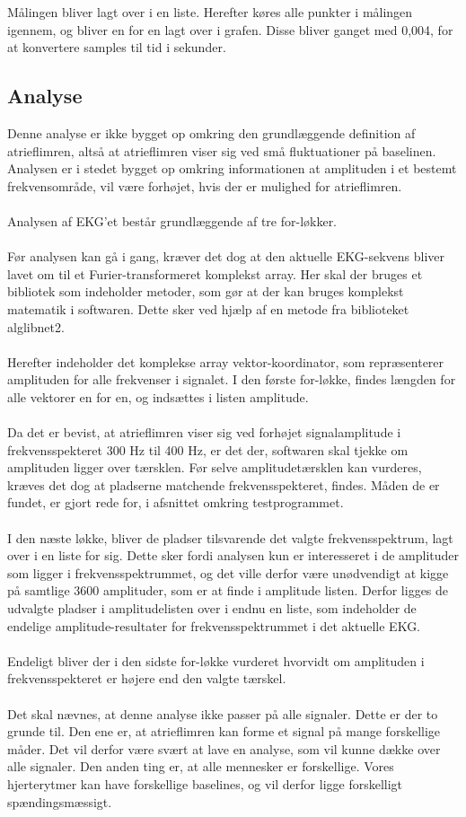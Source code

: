 Målingen bliver lagt over i en liste. Herefter køres alle punkter i målingen igennem, og bliver en for en lagt over i grafen. Disse bliver ganget med 0,004, for at konvertere samples til tid i sekunder. 


\subsection{Analyse}
Denne analyse er ikke bygget op omkring den grundlæggende definition af atrieflimren, altså at atrieflimren viser sig ved små fluktuationer på baselinen. Analysen er i stedet bygget op omkring informationen at amplituden i et bestemt frekvensområde, vil være forhøjet, hvis der er mulighed for atrieflimren. \\ \\
Analysen af EKG’et består grundlæggende af tre for-løkker. \\ \\
Før analysen kan gå i gang, kræver det dog at den aktuelle EKG-sekvens bliver lavet om til et Furier-transformeret komplekst array. Her skal der bruges et bibliotek som indeholder metoder, som gør at der kan bruges komplekst matematik i softwaren. Dette sker ved hjælp af en metode fra biblioteket alglibnet2. \\ \\
Herefter indeholder det komplekse array vektor-koordinator, som repræsenterer amplituden for alle frekvenser i signalet. I den første for-løkke, findes længden for alle vektorer en for en, og indsættes i listen amplitude. \\ \\
Da det er bevist, at atrieflimren viser sig ved forhøjet signalamplitude i frekvensspekteret 300 Hz til 400 Hz, er det der, softwaren skal tjekke om amplituden ligger over tærsklen. Før selve amplitudetærsklen kan vurderes, kræves det dog at pladserne matchende frekvensspekteret, findes. Måden de er fundet, er gjort rede for, i afsnittet omkring testprogrammet. \\ \\
I den næste løkke, bliver de pladser tilsvarende det valgte frekvensspektrum, lagt over i en liste for sig. Dette sker fordi analysen kun er interesseret i de amplituder som ligger i frekvensspektrummet, og det ville derfor være unødvendigt at kigge på samtlige 3600 amplituder, som er at finde i amplitude listen. Derfor ligges de udvalgte pladser i amplitudelisten over i endnu en liste, som indeholder de endelige amplitude-resultater for frekvensspektrummet i det aktuelle EKG. \\ \\
Endeligt bliver der i den sidste for-løkke vurderet hvorvidt om amplituden i frekvensspekteret er højere end den valgte tærskel. \\ \\
Det skal nævnes, at denne analyse ikke passer på alle signaler. Dette er der to grunde til. Den ene er, at atrieflimren kan forme et signal på mange forskellige måder. Det vil derfor være svært at lave en analyse, som vil kunne dække over alle signaler. Den anden ting er, at alle mennesker er forskellige. Vores hjerterytmer kan have forskellige baselines, og vil derfor ligge forskelligt spændingsmæssigt. 

